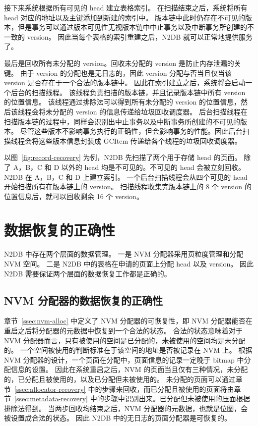 接下来系统根据所有可见的 head 建立表格索引。
在扫描结束之后，系统将所有 head 对应的地址以及主键添加到新建的索引中。
版本链中此时仍存在不可见的版本，但是事务可以通过版本可见性无视版本链中中止事务以及中断事务所创建的不一致的 version。
因此当每个表格的索引重建之后，N2DB 就可以正常地提供服务了。

最后是回收所有未分配的 version。回收未分配的 version 是防止内存泄漏的关键。
由于 version 的分配也是无日志的，因此 version 分配与否当且仅当该 version 是否存在于一个合法的版本链中。
因此在索引建立之后，系统将会启动一个后台的扫描线程。
该线程负责扫描的版本链，并且记录版本链中所有 version 的位置信息。
该线程通过排除法可以得到所有未分配的 version 的位置信息，然后该线程会将未分配的 version 的信息传递给垃圾回收调度器。
后台扫描线程在扫描版本链的过程中，同样会识别出中止事务以及中断事务所创建的不可见的版本。
尽管这些版本不影响事务执行的正确性，但会影响事务的性能。因此后台扫描线程会将这些版本信息封装成 GCItem 传递给各个线程的垃圾回收调度器。

以图~\ref{fig:record-recovery} 为例，N2DB 先扫描了两个用于存储 head 的页面。
除了 A，B，C 和 D 以外的 head 均是不可见的。不可见的 head 会被立刻回收。
N2DB 在 A，B，C 和 D 上建立索引。
一个后台扫描线程会从四个可见的 head 开始扫描所有在版本链上的 version。
扫描线程收集完版本链上的 8 个 version 的位置信息后，就可以回收剩余 16 个 version。

\section{数据恢复的正确性}

N2DB 中存在两个层面的数据管理。
一是 NVM 分配器采用页粒度管理和分配 NVM 空间。
二是 N2DB 中的表格在申请的页面上分配 head 以及 version。
因此 N2DB 需要保证两个层面的数据恢复工作都是正确的。

\subsection{NVM 分配器的数据恢复的正确性}

章节~\ref{ssec:nvm-alloc} 中定义了 NVM 分配器的可恢复性，即 NVM 分配器能否在重启之后将分配器的元数据中恢复到一个合法的状态。
合法的状态意味着对于 NVM 分配器而言，只有被使用的空间是已分配的，未被使用的空间均是未分配的。
一个空间被使用的判断标准在于该空间的地址是否被记录在 NVM 上。
根据 NVM 分配器的设计，一个页面在分配中，页面信息的记录一定晚于 bitmap 中分配信息的设置。
因此在系统重启之后，NVM 的页面当且仅有三种情况，未分配的，已分配且被使用的，以及已分配但未被使用的。
未分配的页面可以通过章节~\ref{ssec:allocator-recovery} 中的步骤来回收，而已分配且被使用的页面将由章节~\ref{ssec:metadata-recovery} 中的步骤中识别出来。已分配但未被使用的压面根据排除法得到。
当两步回收均结束之后，NVM 分配器的元数据，也就是位图，会被设置成合法的状态。
因此 N2DB 中的无日志的页面分配器是可恢复的。

